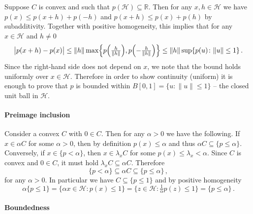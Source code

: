 \documentclass[a4paper]{article}
\newcommand{\Hcal}{\mathcal{H}}
\newcommand{\real}{\mathbb{R}}
\begin{document}
Suppose $C$ is convex and such that $p(\Hcal)\subseteq \real$. Then for any $x, h
\in \Hcal$ we have $p(x) \leq p(x+h) + p(-h)$ and $p(x + h) \leq p(x) + p(h)$ by
subadditivity. Together with positive homogeneity, this implies that for any $x \in
\Hcal$ and $h\neq 0$
\begin{equation*}
  \bigl\lvert p(x + h) - p(x) \bigr\rvert
    \leq \| h \| \max\Bigl\{
        p\Bigl(\tfrac{h}{\|h\|}\Bigr),
        p\Bigl(- \tfrac{h}{\|h\|}\Bigr)
      \Bigr\}
    \leq \| h \| \sup \{p(u)\colon \|u\|\leq 1\}
    \,.
\end{equation*}
Since the right-hand side does not depend on $x$, we note that the bound holds
uniformly over $x \in \Hcal$. Therefore in order to show continuity (uniform) it
is enough to prove that $p$ is bounded within $B[0, 1] = \{u\colon \|u\| \leq 1\}$
-- the closed unit ball in $\Hcal$.


\paragraph{Preimage inclusion} %
\label{par:preimage_inclusion}

Consider a convex $C$ with $0\in C$. Then for any $\alpha > 0$ we have the following.
If $x \in \alpha C$ for some $\alpha > 0$, then by definition $p(x) \leq \alpha$ and
thus $\alpha C \subseteq \{p \leq \alpha\}$. Conversely, if $x\in \{p < \alpha\}$,
then $x \in \lambda_x C$ for some $p(x) \leq \lambda_x < \alpha$. Since $C$ is convex
and $0\in C$, it must hold $\lambda_x C \subseteq \alpha C$. Therefore
\begin{equation*}
  \{p < \alpha \}
    \subseteq \alpha C
    \subseteq \{p \leq \alpha \}
    \,,
\end{equation*}
for any $\alpha > 0$. In particular we have $C \subseteq \{p \leq 1\}$ and by positive
homogeneity
\begin{equation*}
  \alpha \{p\leq 1\}
    = \{\alpha x \in \Hcal \colon p(x) \leq 1\}
    = \bigl\{z \in \Hcal \colon \tfrac1{\alpha} p(z) \leq 1\bigr\}
    = \{p \leq \alpha\}
    \,.
\end{equation*}


\paragraph{Boundedness} %
\label{par:boundedness}
\end{document}
